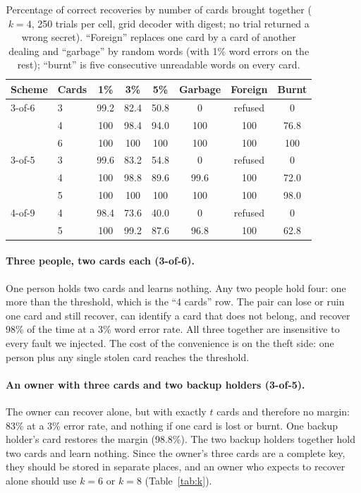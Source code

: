 \documentclass[numeric]{anvil-paper}
\begin{document}
\begin{table}[tb]
\centering
\caption{Percentage of correct recoveries by number of cards brought together
($k=4$, 250 trials per cell, grid decoder with digest; no trial returned a
wrong secret). ``Foreign'' replaces one card by a card of another dealing and
``garbage'' by random words (with 1\% word errors on the rest); ``burnt'' is
five consecutive unreadable words on every card.}
\label{tab:scen}
\small
\begin{tabular}{llcccccc}
\toprule
Scheme & Cards & 1\% & 3\% & 5\% & Garbage & Foreign & Burnt \\
\midrule
3-of-6 & 3 & 99.2 & 82.4 & 50.8 & 0 & refused & 0 \\
       & 4 & 100 & 98.4 & 94.0 & 100 & 100 & 76.8 \\
       & 6 & 100 & 100 & 100 & 100 & 100 & 100 \\
\midrule
3-of-5 & 3 & 99.6 & 83.2 & 54.8 & 0 & refused & 0 \\
       & 4 & 100 & 98.8 & 89.6 & 99.6 & 100 & 72.0 \\
       & 5 & 100 & 100 & 100 & 100 & 100 & 98.0 \\
\midrule
4-of-9 & 4 & 98.4 & 73.6 & 40.0 & 0 & refused & 0 \\
       & 5 & 100 & 99.2 & 87.6 & 96.8 & 100 & 62.8 \\
\bottomrule
\end{tabular}
\end{table}

\paragraph{Three people, two cards each (3-of-6).}
One person holds two cards and learns nothing. Any two people hold four: one
more than the threshold, which is the ``4 cards'' row. The pair can lose or
ruin one card and still recover, can identify a card that does not belong, and
recover 98\% of the time at a 3\% word error rate. All three together are
insensitive to every fault we injected. The cost of the convenience is on the
theft side: one person plus any single stolen card reaches the threshold.

\paragraph{An owner with three cards and two backup holders (3-of-5).}
The owner can recover alone, but with exactly $t$ cards and therefore no
margin: 83\% at a 3\% error rate, and nothing if one card is lost or burnt. One
backup holder's card restores the margin (98.8\%). The two backup holders
together hold two cards and learn nothing. Since the owner's three cards are a
complete key, they should be stored in separate places, and an owner who
expects to recover alone should use $k=6$ or $k=8$ (Table~\ref{tab:k}).
\end{document}
